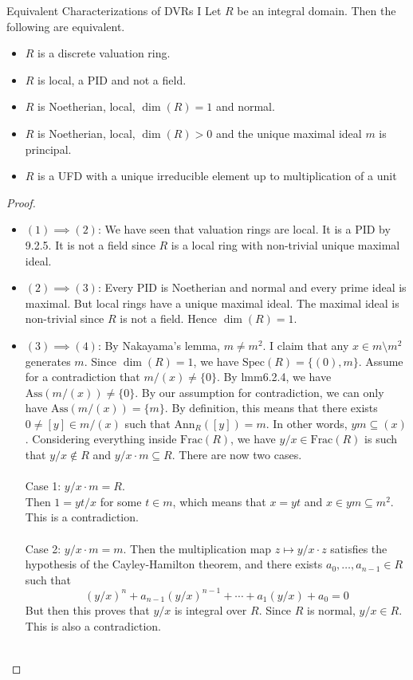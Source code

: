 \documentclass[a4paper]{article}
\begin{document}
\begin{prp}{Equivalent Characterizations of DVRs I}{} Let $R$ be an integral domain. Then the following are equivalent. 
\begin{itemize}
\item $R$ is a discrete valuation ring. 
\item $R$ is local, a PID and not a field. 
\item $R$ is Noetherian, local, $\dim(R)=1$ and normal. 
\item $R$ is Noetherian, local, $\dim(R)>0$ and the unique maximal ideal $m$ is principal. 
\item $R$ is a UFD with a unique irreducible element up to multiplication of a unit
\end{itemize} 
\begin{proof}~\\
\begin{itemize}
\item $(1)\implies(2)$: We have seen that valuation rings are local. It is a PID by 9.2.5. It is not a field since $R$ is a local ring with non-trivial unique maximal ideal. 
\item $(2)\implies(3)$: Every PID is Noetherian and normal and every prime ideal is maximal. But local rings have a unique maximal ideal. The maximal ideal is non-trivial since $R$ is not a field. Hence $\dim(R)=1$. 
\item $(3)\implies(4)$: By Nakayama's lemma, $m\neq m^2$. I claim that any $x\in m\setminus m^2$ generates $m$. Since $\dim(R)=1$, we have $\text{Spec}(R)=\{(0),m\}$. Assume for a contradiction that $m/(x)\neq\{0\}$. By lmm6.2.4, we have $\text{Ass}(m/(x))\neq\{0\}$. By our assumption for contradiction, we can only have $\text{Ass}(m/(x))=\{m\}$. By definition, this means that there exists $0\neq [y]\in m/(x)$ such that $\text{Ann}_R([y])=m$. In other words, $ym\subseteq(x)$. Considering everything inside $\text{Frac}(R)$, we have $y/x\in\text{Frac}(R)$ is such that $y/x\notin R$ and $y/x\cdot m\subseteq R$. There are now two cases. \\~\\

Case 1: $y/x\cdot m=R$. \\
Then $1=yt/x$ for some $t\in m$, which means that $x=yt$ and $x\in ym\subseteq m^2$. This is a contradiction. \\~\\

Case 2: $y/x\cdot m=m$. Then the multiplication map $z\mapsto y/x\cdot z$ satisfies the hypothesis of the Cayley-Hamilton theorem, and there exists $a_0,\dots,a_{n-1}\in R$ such that $$(y/x)^n+a_{n-1}(y/x)^{n-1}+\cdots+a_1(y/x)+a_0=0$$ But then this proves that $y/x$ is integral over $R$. Since $R$ is normal, $y/x\in R$. This is also a contradiction. \\~\\


\end{itemize}
\end{proof}
\end{prp}
\end{document}
